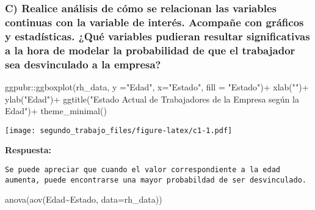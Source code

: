 \documentclass[
]{article}
\newenvironment{Shaded}{\begin{snugshade}}{\end{snugshade}}
\newcommand{\AttributeTok}[1]{\textcolor[rgb]{0.77,0.63,0.00}{#1}}
\newcommand{\FunctionTok}[1]{\textcolor[rgb]{0.00,0.00,0.00}{#1}}
\newcommand{\NormalTok}[1]{#1}
\newcommand{\SpecialCharTok}[1]{\textcolor[rgb]{0.00,0.00,0.00}{#1}}
\newcommand{\StringTok}[1]{\textcolor[rgb]{0.31,0.60,0.02}{#1}}
\begin{document}
\hypertarget{c-realice-anuxe1lisis-de-cuxf3mo-se-relacionan-las-variables-continuas-con-la-variable-de-interuxe9s.-acompauxf1e-con-gruxe1ficos-y-estaduxedsticas.-quuxe9-variables-pudieran-resultar-significativas-a-la-hora-de-modelar-la-probabilidad-de-que-el-trabajador-sea-desvinculado-a-la-empresa}{%
\subsubsection{C) Realice análisis de cómo se relacionan las variables
continuas con la variable de interés. Acompañe con gráficos y
estadísticas. ¿Qué variables pudieran resultar significativas a la hora
de modelar la probabilidad de que el trabajador sea desvinculado a la
empresa?}\label{c-realice-anuxe1lisis-de-cuxf3mo-se-relacionan-las-variables-continuas-con-la-variable-de-interuxe9s.-acompauxf1e-con-gruxe1ficos-y-estaduxedsticas.-quuxe9-variables-pudieran-resultar-significativas-a-la-hora-de-modelar-la-probabilidad-de-que-el-trabajador-sea-desvinculado-a-la-empresa}}

\begin{Shaded}
\begin{Highlighting}[]
\NormalTok{ggpubr}\SpecialCharTok{::}\FunctionTok{ggboxplot}\NormalTok{(rh\_data, }\AttributeTok{y =}\StringTok{"Edad"}\NormalTok{, }\AttributeTok{x=}\StringTok{"Estado"}\NormalTok{, }\AttributeTok{fill =} \StringTok{"Estado"}\NormalTok{)}\SpecialCharTok{+}  
  \FunctionTok{xlab}\NormalTok{(}\StringTok{""}\NormalTok{)}\SpecialCharTok{+} \FunctionTok{ylab}\NormalTok{(}\StringTok{"Edad"}\NormalTok{)}\SpecialCharTok{+}
  \FunctionTok{ggtitle}\NormalTok{(}\StringTok{"Estado Actual de Trabajadores de la Empresa según la Edad"}\NormalTok{)}\SpecialCharTok{+} \FunctionTok{theme\_minimal}\NormalTok{()}
\end{Highlighting}
\end{Shaded}

\texttt{[image: segundo\_trabajo\_files/figure-latex/c1-1.pdf]}

\textbf{Respuesta:}

\begin{verbatim}
Se puede apreciar que cuando el valor correspondiente a la edad aumenta, puede encontrarse una mayor probabildad de ser desvinculado.
\end{verbatim}

\begin{Shaded}
\begin{Highlighting}[]
\FunctionTok{anova}\NormalTok{(}\FunctionTok{aov}\NormalTok{(Edad}\SpecialCharTok{\textasciitilde{}}\NormalTok{Estado, }\AttributeTok{data=}\NormalTok{rh\_data)) }
\end{Highlighting}
\end{Shaded}
\end{document}
